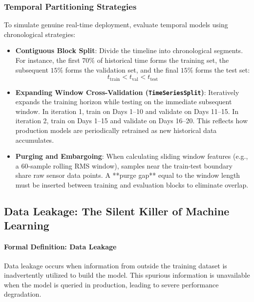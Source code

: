 \subsubsection{Temporal Partitioning Strategies}
To simulate genuine real-time deployment, evaluate temporal models using chronological strategies:
\begin{itemize}
    \item \textbf{Contiguous Block Split}: Divide the timeline into chronological segments. For instance, the first $70\%$ of historical time forms the training set, the subsequent $15\%$ forms the validation set, and the final $15\%$ forms the test set:
    \begin{equation}
    t_{\text{train}} < t_{\text{val}} < t_{\text{test}}\label{eq:time_chronological}
    \end{equation}
    \item \textbf{Expanding Window Cross-Validation (\texttt{TimeSeriesSplit})}: Iteratively expands the training horizon while testing on the immediate subsequent window. In iteration 1, train on Days 1--10 and validate on Days 11--15. In iteration 2, train on Days 1--15 and validate on Days 16--20. This reflects how production models are periodically retrained as new historical data accumulates.
    \item \textbf{Purging and Embargoing}: When calculating sliding window features (e.g., a $60$-sample rolling RMS window), samples near the train-test boundary share raw sensor data points. A **purge gap** equal to the window length must be inserted between training and evaluation blocks to eliminate overlap.
\end{itemize}

\subsection{Data Leakage: The Silent Killer of Machine Learning}\label{subsec:data_leakage}

\paragraph{Formal Definition: Data Leakage}
Data leakage occurs when information from outside the training dataset is inadvertently utilized to build the model. This spurious information is unavailable when the model is queried in production, leading to severe performance degradation.

